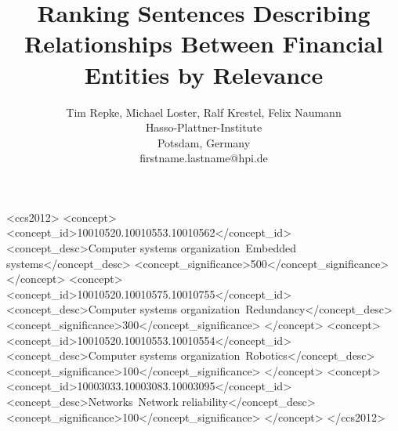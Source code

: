 \documentclass[
	format=sigconf,
	review=false]{acmart}
\title{Ranking Sentences Describing Relationships Between Financial Entities by Relevance}
\author{
	Tim Repke, Michael Loster, Ralf Krestel, Felix Naumann\\
	Hasso-Plattner-Institute\\
	Potsdam, Germany\\
	firstname.lastname@hpi.de
}
\begin{document}

%
%
\begin{CCSXML}
<ccs2012>
 <concept>
  <concept_id>10010520.10010553.10010562</concept_id>
  <concept_desc>Computer systems organization~Embedded systems</concept_desc>
  <concept_significance>500</concept_significance>
 </concept>
 <concept>
  <concept_id>10010520.10010575.10010755</concept_id>
  <concept_desc>Computer systems organization~Redundancy</concept_desc>
  <concept_significance>300</concept_significance>
 </concept>
 <concept>
  <concept_id>10010520.10010553.10010554</concept_id>
  <concept_desc>Computer systems organization~Robotics</concept_desc>
  <concept_significance>100</concept_significance>
 </concept>
 <concept>
  <concept_id>10003033.10003083.10003095</concept_id>
  <concept_desc>Networks~Network reliability</concept_desc>
  <concept_significance>100</concept_significance>
 </concept>
</ccs2012>  
\end{CCSXML}





\maketitle




 
\end{document}
